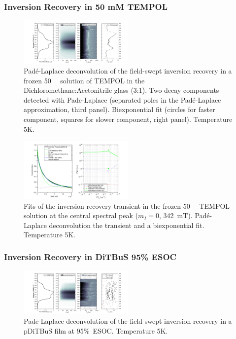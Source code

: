 \newpage
\subsubsection{Inversion Recovery in 50 mM TEMPOL}
\label{esi:pade_laplace_T1}
\begin{figure}[h]
\center
	\includegraphics[width=0.5\textwidth]{./pulse/figures/Figure_S14.png}
	\caption{Pad{\'e}-Laplace deconvolution of the field-swept inversion recovery in a frozen 50~\si{\milli\Molar}  solution of TEMPOL in the Dichloromethane:Acetonitrile glass (3:1). Two decay components detected with Pade-Laplace (separated poles in the Pad{\'e}-Laplace approximation, third panel). Biexponential fit (circles for faster component, squares for slower component, right panel). Temperature 5K.}
	\label{fig:Figure_S14}
\end{figure}


\begin{figure}[ht!]
\center
	\includegraphics[width=0.5\textwidth]{./pulse/figures/Figure_S15.pdf}
	\caption{Fits of the inversion recovery transient in the frozen 50~\si{\milli\Molar}  TEMPOL solution at the central spectral peak ($m_I=0$, 342~mT). Pad{\'e}-Laplace deconvolution the transient and a biexponential fit. Temperature 5K.}
	\label{fig:Figure_S15}
\end{figure}



\newpage
\subsubsection{Inversion Recovery in DiTBuS 95\% ESOC}
\begin{figure}[h]
\center
	\includegraphics[width=0.5\textwidth]{./pulse/figures/Figure_S16.pdf}
	\caption{Pade-Laplace deconvolution of the field-swept inversion recovery in a pDiTBuS film at 95\%~ESOC. Temperature 5K.}
	\label{fig:Figure_S16}
\end{figure}

